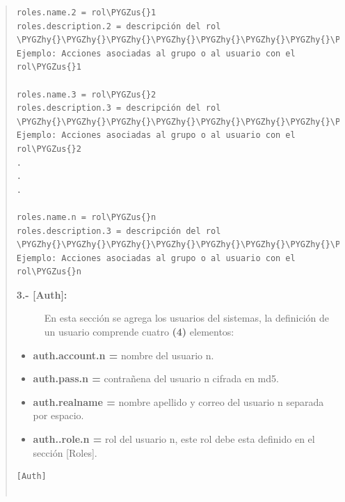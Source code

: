 \documentclass[letterpaper,11pt,spanish]{sphinxmanual}
\def\PYGZus{\char`\_}
\def\PYGZgt{\char`\>}
\def\PYGZhy{\char`\-}
\begin{document}
\begin{quote}
\begin{Verbatim}[commandchars=\\\{\}]
roles.name.2 = rol\PYGZus{}1
roles.description.2 = descripción del rol  \PYGZhy{}\PYGZhy{}\PYGZhy{}\PYGZhy{}\PYGZhy{}\PYGZhy{}\PYGZhy{}\PYGZhy{}\PYGZhy{}\PYGZhy{}\PYGZhy{}\PYGZhy{}\PYGZhy{}\PYGZhy{}\PYGZhy{}\PYGZhy{}\PYGZhy{}\PYGZhy{}\PYGZhy{}\PYGZhy{}\PYGZgt{} Ejemplo: Acciones asociadas al grupo o al usuario con el rol\PYGZus{}1

roles.name.3 = rol\PYGZus{}2
roles.description.3 = descripción del rol  \PYGZhy{}\PYGZhy{}\PYGZhy{}\PYGZhy{}\PYGZhy{}\PYGZhy{}\PYGZhy{}\PYGZhy{}\PYGZhy{}\PYGZhy{}\PYGZhy{}\PYGZhy{}\PYGZhy{}\PYGZhy{}\PYGZhy{}\PYGZhy{}\PYGZhy{}\PYGZhy{}\PYGZhy{}\PYGZhy{}\PYGZgt{} Ejemplo: Acciones asociadas al grupo o al usuario con el rol\PYGZus{}2
.
.
.

roles.name.n = rol\PYGZus{}n
roles.description.3 = descripción del rol  \PYGZhy{}\PYGZhy{}\PYGZhy{}\PYGZhy{}\PYGZhy{}\PYGZhy{}\PYGZhy{}\PYGZhy{}\PYGZhy{}\PYGZhy{}\PYGZhy{}\PYGZhy{}\PYGZhy{}\PYGZhy{}\PYGZhy{}\PYGZhy{}\PYGZhy{}\PYGZhy{}\PYGZhy{}\PYGZhy{}\PYGZgt{} Ejemplo: Acciones asociadas al grupo o al usuario con el rol\PYGZus{}n
\end{Verbatim}
\begin{description}
\item[{\textbf{3.- {[}Auth{]}:}}] \leavevmode
En esta sección se agrega los usuarios del sistemas, la definición de un usuario comprende cuatro \textbf{(4)} elementos:

\end{description}
\begin{itemize}
\item {} 
\textbf{auth.account.n =} nombre del usuario n.

\item {} 
\textbf{auth.pass.n =} contrañena del usuario n cifrada en md5.

\item {} 
\textbf{auth.realname =} nombre apellido y correo del usuario n separada por espacio.

\item {} 
\textbf{auth..role.n =} rol del usuario n, este rol debe esta definido en el sección {[}Roles{]}.

\end{itemize}

\begin{Verbatim}[commandchars=\\\{\}]
[Auth]


\end{Verbatim}
\end{quote}
\end{document}
